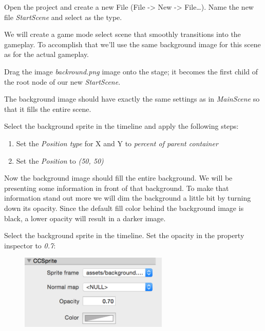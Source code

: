 \begin{leftbar}
Open the \SB{} project and create a new File (File -> New -> File\ldots). Name
the new file \textit{StartScene} and select  as the type.
\end{leftbar}

We will create a game mode select scene that smoothly transitions into the
gameplay. To accomplish that we'll use the same background image for this scene
as for the actual gameplay. 

\begin{leftbar}
Drag the image \textit{backround.png} image onto the stage; it becomes the first
child of the root node of our new \textit{StartScene}.
\end{leftbar}

The background image should have exactly the same settings as in
\textit{MainScene} so that it fills the entire scene.

\begin{leftbar}
Select the background sprite in the timeline and apply the following steps:
\begin{enumerate}
  \item Set the \textit{Position type} for X and Y to \textit{percent of parent
  container}
  \item Set the \textit{Position} to \textit{(50, 50)}
\end{enumerate}
\end{leftbar}

Now the background image should fill the entire background. We will be
presenting some information in front of that background. To make that
information stand out more we will dim the background a little bit by turning
down its opacity. Since the default fill color behind the background image is
black, a lower opacity will result in a darker image.

\begin{leftbar}
Select the background sprite in the timeline. Set the opacity in the property
inspector to \textit{0.7}:
\begin{figure}[H]
		\centering
		\includegraphics[width=200pt]{images/Chapter6/opacity_lower.png}
\end{figure}
\end{leftbar}

